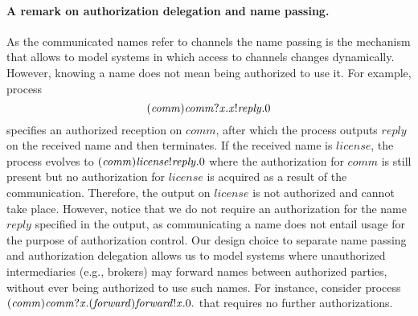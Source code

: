 \paragraph{{A remark on authorization delegation and name passing}.}
As the communicated names refer to channels the name passing is the mechanism that allows to model systems in which access to channels 
changes dynamically. However, knowing a name does not mean being authorized to use it. 
For example, process
\[(\mathit{comm})\mathit{comm}?\mathit{x}.\mathit{x}!\mathit{reply}.0
\] 
specifies an authorized reception
on $\mathit{comm}$, after which the process outputs $\mathit{reply}$ on the received name and then terminates.
If the received name is $\mathit{license}$, the process evolves to
$(\mathit{comm})\mathit{license}!\mathit{reply}.0$
where the authorization for $\mathit{comm}$ is still present but no authorization 
for $\mathit{license}$ is acquired as a result of the communication. Therefore,
the output on $\mathit{license}$ is not authorized and cannot take
place. However, notice that we do not require an authorization for the name
$\mathit{reply}$ specified in the output, 
as communicating a name does not entail usage for the purpose of
authorization control. Our design choice to separate name passing and authorization delegation allows us to model systems where unauthorized intermediaries (e.g., brokers)
may forward names between authorized parties, without ever 
being authorized to use such names. For instance, consider process $(\mathit{comm})\mathit{comm}?\mathit{x}.(\mathit{forward})\mathit{forward}!\mathit{x}.0.$ 
that requires no further authorizations.

